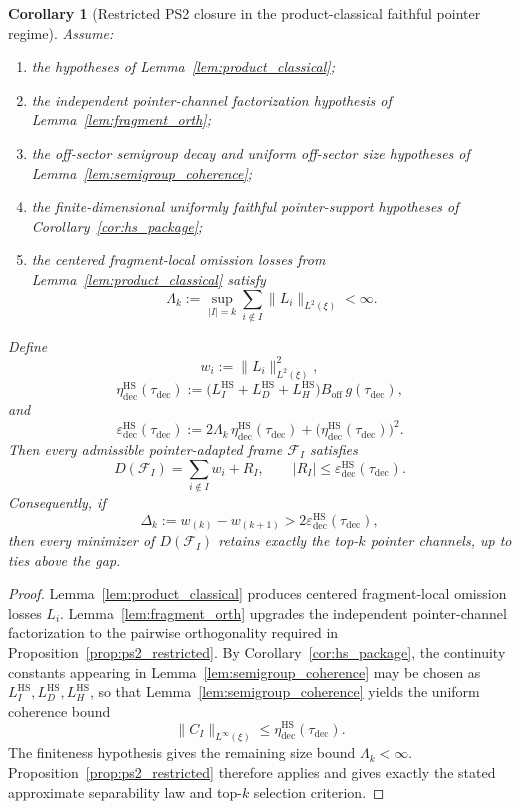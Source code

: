 \documentclass[12pt]{article}
\newtheorem{corollary}[theorem]{Corollary}
\theoremstyle{definition}
\theoremstyle{remark}
\begin{document}
\begin{corollary}[Restricted PS2 closure in the product-classical faithful pointer regime]\label{cor:ps2_closure}
Assume:
\begin{enumerate}
\item the hypotheses of Lemma~\ref{lem:product_classical};
\item the independent pointer-channel factorization hypothesis of
  Lemma~\ref{lem:fragment_orth};
\item the off-sector semigroup decay and uniform off-sector size
  hypotheses of Lemma~\ref{lem:semigroup_coherence};
\item the finite-dimensional uniformly faithful pointer-support
  hypotheses of Corollary~\ref{cor:hs_package};
\item the centered fragment-local omission losses from
  Lemma~\ref{lem:product_classical} satisfy
  \[
  \Lambda_k
  :=
  \sup_{|I|=k}
  \sum_{i\notin I}\|L_i\|_{L^2(\xi)}
  <
  \infty.
  \]
\end{enumerate}
Define
\[
w_i:=\|L_i\|_{L^2(\xi)}^2,
\]
\[
\eta_{\mathrm{dec}}^{\mathrm{HS}}(\tau_{\mathrm{dec}})
:=
\bigl(
L_I^{\mathrm{HS}}+L_D^{\mathrm{HS}}+L_H^{\mathrm{HS}}
\bigr)
B_{\mathrm{off}}\,g(\tau_{\mathrm{dec}}),
\]
and
\[
\varepsilon_{\mathrm{dec}}^{\mathrm{HS}}(\tau_{\mathrm{dec}})
:=
2\Lambda_k\,\eta_{\mathrm{dec}}^{\mathrm{HS}}(\tau_{\mathrm{dec}})
+
\bigl(\eta_{\mathrm{dec}}^{\mathrm{HS}}(\tau_{\mathrm{dec}})\bigr)^2.
\]
Then every admissible pointer-adapted frame \(\mathcal F_I\) satisfies
\[
D(\mathcal F_I)
=
\sum_{i\notin I} w_i + R_I,
\qquad
|R_I|
\le
\varepsilon_{\mathrm{dec}}^{\mathrm{HS}}(\tau_{\mathrm{dec}}).
\]
Consequently, if
\[
\Delta_k:=w_{(k)}-w_{(k+1)}
>
2\varepsilon_{\mathrm{dec}}^{\mathrm{HS}}(\tau_{\mathrm{dec}}),
\]
then every minimizer of \(D(\mathcal F_I)\) retains exactly the top-\(k\)
pointer channels, up to ties above the gap.
\end{corollary}

\begin{proof}
Lemma~\ref{lem:product_classical} produces centered fragment-local
omission losses \(L_i\). Lemma~\ref{lem:fragment_orth} upgrades the
independent pointer-channel factorization to the pairwise orthogonality
required in Proposition~\ref{prop:ps2_restricted}. By
Corollary~\ref{cor:hs_package}, the continuity constants appearing in
Lemma~\ref{lem:semigroup_coherence} may be chosen as
\(L_I^{\mathrm{HS}},L_D^{\mathrm{HS}},L_H^{\mathrm{HS}}\), so that
Lemma~\ref{lem:semigroup_coherence} yields the uniform coherence bound
\[
\|C_I\|_{L^\infty(\xi)}
\le
\eta_{\mathrm{dec}}^{\mathrm{HS}}(\tau_{\mathrm{dec}}).
\]
The finiteness hypothesis gives the remaining size bound
\(\Lambda_k<\infty\). Proposition~\ref{prop:ps2_restricted} therefore
applies and gives exactly the stated approximate separability law and
top-\(k\) selection criterion.
\end{proof}
\end{document}
